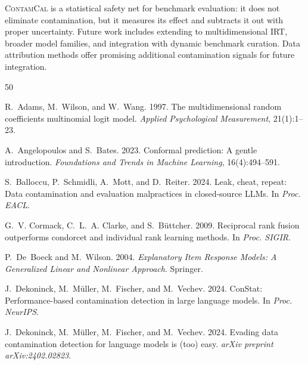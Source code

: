 \documentclass[11pt,a4paper]{article}
\newcommand{\contamcal}{\textsc{ContamCal}}
\begin{document}
\contamcal{} is a statistical safety net for benchmark evaluation: it does not eliminate contamination, but it measures its effect and subtracts it out with proper uncertainty.
Future work includes extending to multidimensional IRT, broader model families, and integration with dynamic benchmark curation.
Data attribution methods \citep{pruthi2020estimating,park2023trak} offer promising additional contamination signals for future integration.




\begin{thebibliography}{50}

R.~Adams, M.~Wilson, and W.~Wang. 1997.
\newblock The multidimensional random coefficients multinomial logit model.
\newblock \emph{Applied Psychological Measurement}, 21(1):1--23.

A.~Angelopoulos and S.~Bates. 2023.
\newblock Conformal prediction: A gentle introduction.
\newblock \emph{Foundations and Trends in Machine Learning}, 16(4):494--591.

S.~Balloccu, P.~Schmidli, A.~Mott, and D.~Reiter. 2024.
\newblock Leak, cheat, repeat: Data contamination and evaluation malpractices in closed-source LLMs.
\newblock In \emph{Proc. EACL}.

G.~V. Cormack, C.~L.~A. Clarke, and S.~B\"uttcher. 2009.
\newblock Reciprocal rank fusion outperforms condorcet and individual rank learning methods.
\newblock In \emph{Proc. SIGIR}.

P.~De~Boeck and M.~Wilson. 2004.
\newblock \emph{Explanatory Item Response Models: A Generalized Linear and Nonlinear Approach}.
\newblock Springer.

J.~Dekoninck, M.~Müller, M.~Fischer, and M.~Vechev. 2024.
\newblock ConStat: Performance-based contamination detection in large language models.
\newblock In \emph{Proc. NeurIPS}.

J.~Dekoninck, M.~Müller, M.~Fischer, and M.~Vechev. 2024.
\newblock Evading data contamination detection for language models is (too) easy.
\newblock \emph{arXiv preprint arXiv:2402.02823}.


\end{thebibliography}
\end{document}
